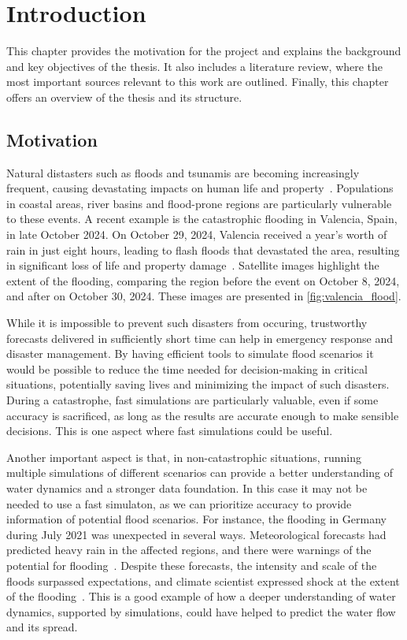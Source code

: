 \chapter{Introduction}
This chapter provides the motivation for the project and explains the background and key objectives of the thesis.
It also includes a literature review, where the most important sources relevant to this work are outlined.
Finally, this chapter offers an overview of the thesis and its structure.

\section{Motivation}
Natural distasters such as floods and tsunamis are becoming increasingly frequent, causing devastating impacts on human life and property~\cite{najibi2018global_floods}.
Populations in coastal areas, river basins and flood-prone regions are particularly vulnerable to these events.
A recent example is the catastrophic flooding in Valencia, Spain, in late October 2024.
On October 29, 2024, Valencia received a year's worth of rain in just eight hours, leading to flash floods that devastated the area, resulting in significant loss of life and property damage~\cite{valencia_flood_disaster_esa}.
Satellite images highlight the extent of the flooding, comparing the region before the event on October 8, 2024, and after on October 30, 2024.
These images are presented in \autoref{fig:valencia_flood}.

While it is impossible to prevent such disasters from occuring, trustworthy forecasts delivered in sufficiently short time can help in emergency response and disaster management.
By having efficient tools to simulate flood scenarios it would be possible to reduce the time needed for decision-making in critical situations, potentially saving lives and minimizing the impact of such disasters.
During a catastrophe, fast simulations are particularly valuable, even if some accuracy is sacrificed, as long as the results are accurate enough to make sensible decisions.
This is one aspect where fast simulations could be useful.

Another important aspect is that, in non-catastrophic situations, running multiple simulations of different scenarios can provide a better understanding of water dynamics and a stronger data foundation.
In this case it may not be needed to use a fast simulaton, as we can prioritize accuracy to provide information of potential flood scenarios.
For instance, the flooding in Germany during July 2021 was unexpected in several ways.
Meteorological forecasts had predicted heavy rain in the affected regions, and there were warnings of the potential for flooding~\cite{fathom_floods_2021}.
Despite these forecasts, the intensity and scale of the floods surpassed expectations, and climate scientist expressed shock at the extent of the flooding~\cite{guardian_floods_2021}.
This is a good example of how a deeper understanding of water dynamics, supported by simulations, could have helped to predict the water flow and its spread.

